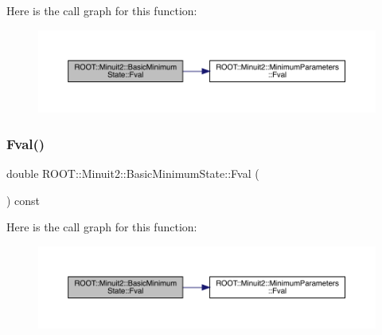 Here is the call graph for this function\+:
\nopagebreak
\begin{figure}[H]
\begin{center}
\leavevmode
\includegraphics[width=350pt]{d0/db1/classROOT_1_1Minuit2_1_1BasicMinimumState_a5151d99e7c6cd7f3b070ad2c62222010_cgraph}
\end{center}
\end{figure}
\mbox{\label{classROOT_1_1Minuit2_1_1BasicMinimumState_a5151d99e7c6cd7f3b070ad2c62222010}} 
\subsubsection{\texorpdfstring{Fval()}{Fval()}\hspace{0.1cm}{\footnotesize\ttfamily [2/2]}}
{\footnotesize\ttfamily double R\+O\+O\+T\+::\+Minuit2\+::\+Basic\+Minimum\+State\+::\+Fval (\begin{DoxyParamCaption}{ }\end{DoxyParamCaption}) const\hspace{0.3cm}{\ttfamily [inline]}}

Here is the call graph for this function\+:
\nopagebreak
\begin{figure}[H]
\begin{center}
\leavevmode
\includegraphics[width=350pt]{d0/db1/classROOT_1_1Minuit2_1_1BasicMinimumState_a5151d99e7c6cd7f3b070ad2c62222010_cgraph}
\end{center}
\end{figure}
\mbox{\label{classROOT_1_1Minuit2_1_1BasicMinimumState_a45b6c728054b409349fb2f6f725a8ab6}} 
